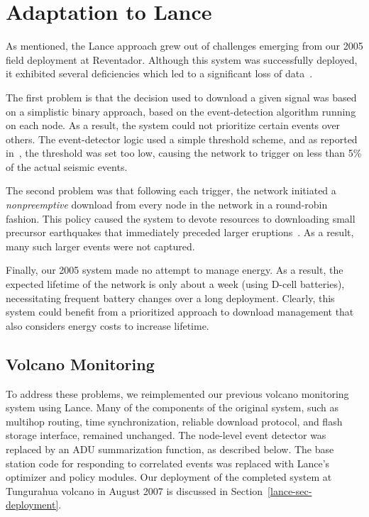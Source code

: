 \section{Adaptation to Lance}
\label{lance-sec-adaptation}

As mentioned, the Lance approach grew out of challenges emerging from our
2005 field deployment at Reventador. Although this system was successfully
deployed, it exhibited several deficiencies which led to a significant loss
of data~\cite{volcano-osdi06}. 

The first problem is that the decision used to download a given signal was
based on a simplistic binary approach, based on the event-detection algorithm
running on each node. As a result, the system could not prioritize certain
events over others. The event-detector logic used a simple threshold scheme,
and as reported in~\cite{volcano-osdi06}, the threshold was set too low,
causing the network to trigger on less than 5\% of the actual seismic events.

The second problem was that following each trigger, the network initiated a
{\em nonpreemptive} download from every node in the network in a round-robin
fashion. This policy caused the system to devote resources to downloading
small precursor earthquakes that immediately preceded larger
eruptions~\cite{volcano-osdi06}. As a result, many such larger events were
not captured. 

Finally, our 2005 system made no attempt to manage energy. As a result,
the expected lifetime of the network is only about a week (using D-cell
batteries), necessitating frequent battery changes over a long deployment.
Clearly, this system could benefit from a prioritized approach to download
management that also considers energy costs to increase lifetime.

\subsection{Volcano Monitoring}
\label{lance-subsec-volcano}

To address these problems, we reimplemented our previous volcano monitoring
system using Lance. Many of the components of the original system, such as
multihop routing, time synchronization, reliable download protocol, and flash
storage interface, remained unchanged.  The node-level event detector was
replaced by an ADU summarization function, as described below. The base
station code for responding to correlated events was replaced with Lance's
optimizer and policy modules. Our deployment of the completed system at
Tungurahua volcano in August 2007 is discussed in
Section~\ref{lance-sec-deployment}.

